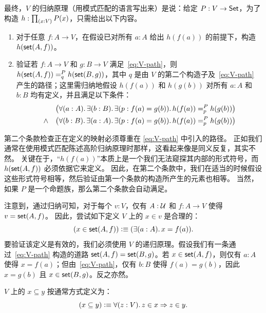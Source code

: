 %
最终，$V$ 的归纳原理（用模式匹配的语言写出来）是说：给定 $P:V\to \set$，为了构造 $h:\prd{x:V} P(x)$，只需给出以下内容。

\begin{enumerate}
\item 对于任意 $f:A\to V$，在假设已对所有 $a:A$ 给出 $h(f(a))$ 的前提下，构造 $h(\vset(A,f))$。
\item 验证若 $f : A \to V$ 和 $g : B \to V$ 满足~\eqref{eq:V-path}，则 $\dpath{P}{q}{h(\vset(A,f))}{h(\vset(B,g))}$，其中 $q$ 是由 $V$ 的第二个构造子及~\eqref{eq:V-path} 产生的路径；这里需归纳地假设 $h(f(a))$ 和 $h(g(b))$ 对所有 $a:A$ 和 $b:B$ 均有定义，并且满足以下条件：
\begin{eqnarray*}
    &       & \big(\fall{a:A} \exis{b:B} \exis{p:f(a)=g(b)} \dpath{P}{p}{h(f(a))}{h(g(b))}\big) \\
    & \land & \big(\fall{b:B} \exis{a:A} \exis{p:f(a)=g(b)} \dpath{P}{p}{h(f(a))}{h(g(b))}\big)
\end{eqnarray*}
\end{enumerate}

第二个条款检查正在定义的映射必须尊重在 \eqref{eq:V-path} 中引入的路径。
正如我们通常在使用模式匹配陈述高阶归纳原理时那样，这看起来像是同义反复，其实不然。
关键在于，“$h(f(a))$”本质上是一个我们无法窥探其内部的形式符号，而 $h(\vset(A,f))$ 必须依据它来定义。
因此，在第二个条款中，我们在适当的时候假设这些形式符号相等，然后验证由第一个条款的构造所产生的元素也相等。
当然，如果 $P$ 是一个命题族，那么第二个条款会自动满足。

注意到，通过归纳可知，对于每个 $v:V$，仅有 $A:\UU$ 和 $f:A\to V$ 使得 $v=\vset(A,f)$。
因此，尝试如下定义 $V$ 上的 
%
$x\in v$ 是合理的：
%
%
\begin{equation*}
  (x \in \vset(A,f)) \defeq (\exis{a : A} x = f(a)).
\end{equation*}
%
要验证该定义是有效的，我们必须使用 $V$ 的递归原理。假设我们有一条通过~\eqref{eq:V-path} 构造的道路 $\vset(A, f) = \vset(B, g)$。若 $x \in \vset(A,f)$，则仅有 $a : A$ 使得 $x = f(a)$；但由~\eqref{eq:V-path}，仅有 $b : B$ 使得 $f(a) = g(b)$，因此 $x = g(b)$ 且 $x \in \vset(B,g)$。反之亦然。

$V$ 上的 
%
$x\subseteq y$ 按通常方式定义为：
%
\begin{equation*}
  (x \subseteq y) \defeq \fall{z : V} z \in x \Rightarrow z \in y.
\end{equation*}


